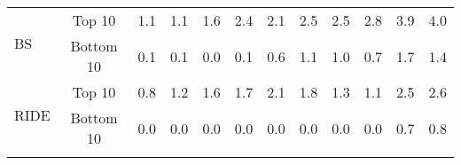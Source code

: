 \documentclass{article}
\newcommand{\thickhline}{\hlineB{4}}
\begin{document}
{\begin{table}[ht]
{{\begin{tabular}{l|c|cccccccccc}
\multirow{2}{*}{BS}       & Top 10    & 1.1                    & 1.1                    & 1.6                    & 2.4                    & 2.1                     & 2.5                     & 2.5                     & 2.8                     & 3.9                     & 4.0                     \\
                          & Bottom 10 & 0.1                    & 0.1                    & 0.0                    & 0.1                    & 0.6                     & 1.1                     & 1.0                     & 0.7                     & 1.7                     & 1.4                     \\ \midrule
\multirow{2}{*}{RIDE}     & Top 10    & 0.8                    & 1.2                    & 1.6                    & 1.7                    & 2.1                     & 1.8                     & 1.3                     & 1.1                     & 2.5                     & 2.6                     \\
                          & Bottom 10 & 0.0                    & 0.0                    & 0.0                    & 0.0                    & 0.0                     & 0.0                     & 0.0                     & 0.0                     & 0.7                     & 0.8   \\
\thickhline
\end{tabular}}}
\end{table} }
\end{document}
